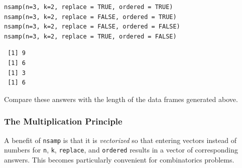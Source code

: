 \documentclass[captions=tableheading]{scrbook}
\begin{document}
\begin{verbatim}
nsamp(n=3, k=2, replace = TRUE, ordered = TRUE) 
nsamp(n=3, k=2, replace = FALSE, ordered = TRUE) 
nsamp(n=3, k=2, replace = FALSE, ordered = FALSE) 
nsamp(n=3, k=2, replace = TRUE, ordered = FALSE)
\end{verbatim}

\begin{verbatim}
 [1] 9
 [1] 6
 [1] 3
 [1] 6
\end{verbatim}

Compare these answers with the length of the data frames generated above.
\subsubsection{The Multiplication Principle}
\label{sec-4-5-2-2}


A benefit of \texttt{nsamp} is that it is \emph{vectorized} so that entering vectors instead of numbers for \texttt{n}, \texttt{k}, \texttt{replace}, and \texttt{ordered} results in a vector of corresponding answers. This becomes particularly convenient for combinatorics problems.
\end{document}
